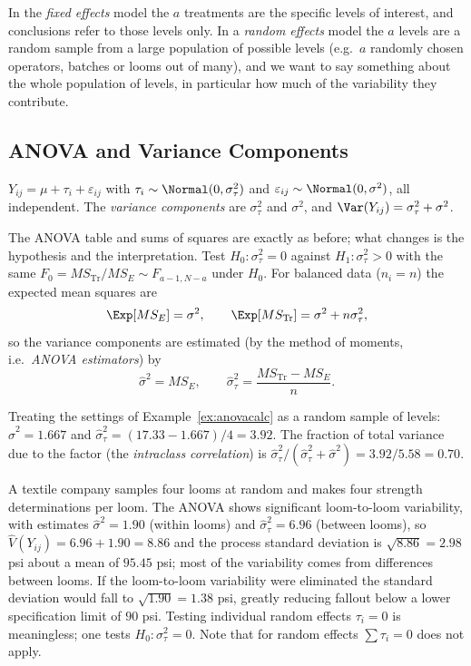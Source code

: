 In the \emph{fixed effects} model the $a$ treatments are the specific levels of interest, and conclusions refer to those levels only. In a \emph{random effects} model the $a$ levels are a random sample from a large population of possible levels (e.g.\ $a$ randomly chosen operators, batches or looms out of many), and we want to say something about the whole population of levels, in particular how much of the variability they contribute.

\subsection{ANOVA and Variance Components}

\begin{definition}
$Y_{ij}=\mu+\tau_i+\varepsilon_{ij}$ with $\tau_i\sim\Normal(0,\sigma_\tau^2)$ and $\varepsilon_{ij}\sim\Normal(0,\sigma^2)$, all independent. The \emph{variance components} are $\sigma_\tau^2$ and $\sigma^2$, and $\Var(Y_{ij})=\sigma_\tau^2+\sigma^2$.
\end{definition}

The ANOVA table and sums of squares are exactly as before; what changes is the hypothesis and the interpretation. Test $H_0:\sigma_\tau^2=0$ against $H_1:\sigma_\tau^2>0$ with the same $F_0=MS_{\mathrm{Tr}}/MS_E\sim F_{a-1,N-a}$ under $H_0$. For balanced data ($n_i=n$) the expected mean squares are
\[ \Exp[MS_E]=\sigma^2,\qquad\Exp[MS_{\mathrm{Tr}}]=\sigma^2+n\sigma_\tau^2, \]
so the variance components are estimated (by the method of moments, i.e.\ \emph{ANOVA estimators}) by
\[ \hat\sigma^2=MS_E,\qquad\hat\sigma_\tau^2=\frac{MS_{\mathrm{Tr}}-MS_E}n. \]

\begin{example}
Treating the settings of Example~\ref{ex:anovacalc} as a random sample of levels: $\hat\sigma^2=1.667$ and $\hat\sigma_\tau^2=(17.33-1.667)/4=3.92$. The fraction of total variance due to the factor (the \emph{intraclass correlation}) is $\hat\sigma_\tau^2/(\hat\sigma_\tau^2+\hat\sigma^2)=3.92/5.58=0.70$.
\end{example}

\begin{example}
A textile company samples four looms at random and makes four strength determinations per loom. The ANOVA shows significant loom-to-loom variability, with estimates $\hat\sigma^2=1.90$ (within looms) and $\hat\sigma_\tau^2=6.96$ (between looms), so $\widehat{V}(Y_{ij})=6.96+1.90=8.86$ and the process standard deviation is $\sqrt{8.86}=2.98$ psi about a mean of $95.45$ psi; most of the variability comes from differences between looms. If the loom-to-loom variability were eliminated the standard deviation would fall to $\sqrt{1.90}=1.38$ psi, greatly reducing fallout below a lower specification limit of $90$ psi. Testing individual random effects $\tau_i=0$ is meaningless; one tests $H_0:\sigma_\tau^2=0$. Note that for random effects $\sum\tau_i=0$ does not apply.
\end{example}

